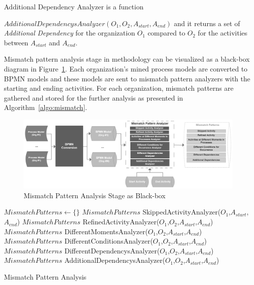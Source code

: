 \begin{description}
		\begin{definition}
		Additional Dependency Analyzer is a function 

		$AdditionalDependencysAnalyzer(O_{1}, O_{2}, A_{start}, A_{end})$ and it returns a set of \textit{Additional Dependency} for the organization $O_{1}$ compared to $O_{2}$ for the activities between $A_{start}$ and $A_{end}$.
		\end{definition}	
 \end{description}
 
Mismatch pattern analysis stage in methodology can be visualized as a black-box diagram in Figure~\ref{fig:mismatch-pattern-analysis-blackbox}. Each organization's mined process models are converted to BPMN models and these models are sent to mismatch pattern analyzers with the starting and ending activities. For each organization, mismatch patterns are gathered and stored for the further analysis as presented in Algorithm~\ref{algo:mismatch}.
\begin{figure}
  \centering
  \includegraphics[width=\textwidth]{4_methodology/mismatch-pattern-analysis-blackbox}
  \caption{Mismatch Pattern Analysis Stage as Black-box}
  \label{fig:mismatch-pattern-analysis-blackbox}
\end{figure}

\begin{algorithm}
\DontPrintSemicolon %
$MismatchPatterns \leftarrow \{\}$ \;
$MismatchPatterns$ \leftarrow  SkippedActivityAnalyzer($O_{1}$,$A_{start}$,$A_{end}$) \;
$MismatchPatterns$ \leftarrow  RefinedActivityAnalyzer($O_{1}$,$O_{2}$,$A_{start}$,$A_{end}$) \;
$MismatchPatterns$ \leftarrow  DifferentMomentsAnalyzer($O_{1}$,$O_{2}$,$A_{start}$,$A_{end}$) \;
$MismatchPatterns$ \leftarrow  DifferentConditionsAnalyzer($O_{1}$,$O_{2}$,$A_{start}$,$A_{end}$) \;
$MismatchPatterns$ \leftarrow  DifferentDependencysAnalyzer($O_{1}$,$O_{2}$,$A_{start}$,$A_{end}$) \;
$MismatchPatterns$ \leftarrow  AdditionalDependencysAnalyzer($O_{1}$,$O_{2}$,$A_{start}$,$A_{end}$) \;
\;
\caption{Mismatch Pattern Analysis}
\label{algo:mismatch}
\end{algorithm}

